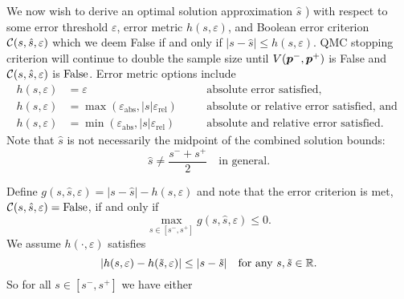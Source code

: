\documentclass{article}[12pt]
\newcommand{\varepsabs}{\varepsilon_\text{abs}}
\newcommand{\varepsrel}{\varepsilon_\text{rel}}
\newcommand{\JRComment}[1]{{\color{violet} Jag: #1}}
\begin{document}
We now wish to derive an optimal solution approximation $\hat{s}$ ) with respect to some error threshold $\varepsilon$, error metric $h(s,\varepsilon)$, and Boolean error criterion $\mathcal{C}(s,\hat{s},\varepsilon)$ which we deem False if and only if $\lvert s - \hat{s} \rvert \leq h(s,\varepsilon)$. QMC stopping criterion will continue to double the sample size until $V(\boldsymbol{p}^-,\boldsymbol{p}^+)$ is False and $\mathcal{C}(s,\hat{s},\varepsilon)$ is  $\text{False}$. Error metric options include
\begin{subequations}
\begin{align}
    h(s,\varepsilon) & = \varepsilon \quad &&\text{absolute error satisfied}, \label{eq:h_abs}\\
    h(s,\varepsilon) &= \max\left(\varepsabs,\lvert s \rvert \varepsrel \right) \quad &&\text{absolute or relative error satisfied, and } \label{eq:h_abs_or_rel} \\
    h(s,\varepsilon) &= \min\left(\varepsabs,\lvert s \rvert \varepsrel \right) \quad &&\text{absolute and relative error satisfied.} \label{eq:h_abs_and_rel}
\end{align}
\end{subequations}
Note that $\hat{s}$ is not necessarily the midpoint of the combined solution bounds:
\begin{equation}
    \hat{s} \neq \frac{s^-+s^+}{2} \quad \text{in general.}
\end{equation}

Define $g(s,\hat{s},\varepsilon)=\lvert s - \hat{s} \rvert -h(s,\varepsilon)$ and note that the error criterion is met, $\mathcal{C}(s,\hat{s},\varepsilon) = \text{False}$, if and only if 
\begin{equation}
    \max_{s \in [s^-,s^+]} g(s,\hat{s},\varepsilon) \leq 0.
\end{equation}
We assume $h(\cdot,\varepsilon)$ satisfies 
\begin{equation}
    \lvert h(s,\varepsilon) - h(\tilde{s},\varepsilon) \rvert \leq \lvert s - \tilde{s} \rvert \quad \text{for any } s,\tilde{s} \in \mathbb{R}.
\end{equation}
So for all $s \in [s^-,s^+]$ we have either
\end{document}
